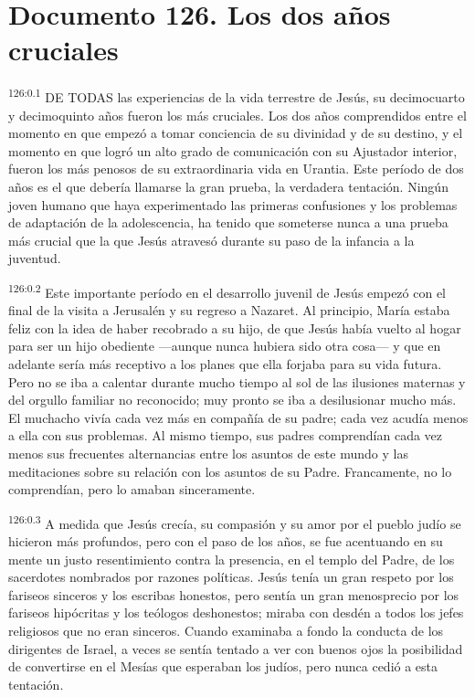 \chapter{Documento 126. Los dos años cruciales}
\par 
\textsuperscript{126:0.1} DE TODAS las experiencias de la vida terrestre de Jesús, su decimocuarto y decimoquinto años fueron los más cruciales. Los dos años comprendidos entre el momento en que empezó a tomar conciencia de su divinidad y de su destino, y el momento en que logró un alto grado de comunicación con su Ajustador interior, fueron los más penosos de su extraordinaria vida en Urantia. Este período de dos años es el que debería llamarse la gran prueba, la verdadera tentación. Ningún joven humano que haya experimentado las primeras confusiones y los problemas de adaptación de la adolescencia, ha tenido que someterse nunca a una prueba más crucial que la que Jesús atravesó durante su paso de la infancia a la juventud.

\par 
\textsuperscript{126:0.2} Este importante período en el desarrollo juvenil de Jesús empezó con el final de la visita a Jerusalén y su regreso a Nazaret. Al principio, María estaba feliz con la idea de haber recobrado a su hijo, de que Jesús había vuelto al hogar para ser un hijo obediente ---aunque nunca hubiera sido otra cosa--- y que en adelante sería más receptivo a los planes que ella forjaba para su vida futura. Pero no se iba a calentar durante mucho tiempo al sol de las ilusiones maternas y del orgullo familiar no reconocido; muy pronto se iba a desilusionar mucho más. El muchacho vivía cada vez más en compañía de su padre; cada vez acudía menos a ella con sus problemas. Al mismo tiempo, sus padres comprendían cada vez menos sus frecuentes alternancias entre los asuntos de este mundo y las meditaciones sobre su relación con los asuntos de su Padre. Francamente, no lo comprendían, pero lo amaban sinceramente.

\par 
\textsuperscript{126:0.3} A medida que Jesús crecía, su compasión y su amor por el pueblo judío se hicieron más profundos, pero con el paso de los años, se fue acentuando en su mente un justo resentimiento contra la presencia, en el templo del Padre, de los sacerdotes nombrados por razones políticas. Jesús tenía un gran respeto por los fariseos sinceros y los escribas honestos, pero sentía un gran menosprecio por los fariseos hipócritas y los teólogos deshonestos; miraba con desdén a todos los jefes religiosos que no eran sinceros. Cuando examinaba a fondo la conducta de los dirigentes de Israel, a veces se sentía tentado a ver con buenos ojos la posibilidad de convertirse en el Mesías que esperaban los judíos, pero nunca cedió a esta tentación.

